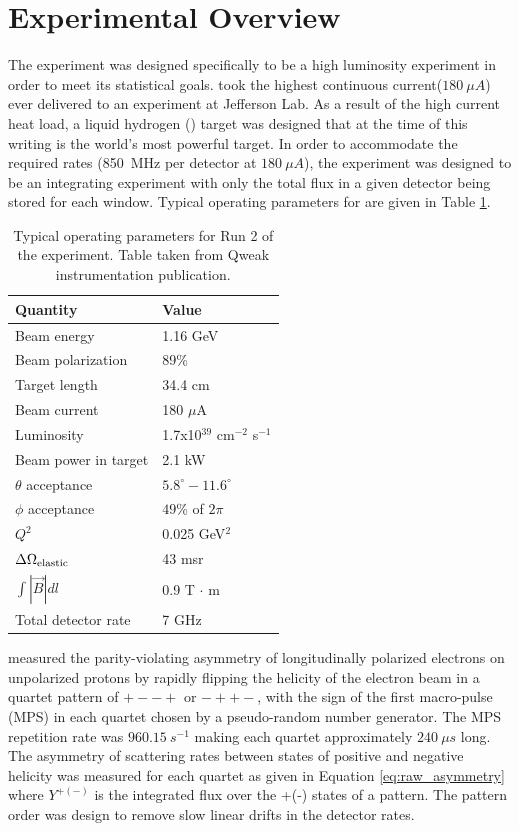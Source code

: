 \section{Experimental Overview}
The \Qs experiment was designed specifically to be a high luminosity experiment in order to meet its statistical goals. \Qs took the highest continuous current($180~\mu A$) ever delivered to an experiment at Jefferson Lab. As a result of the high current heat load, a liquid hydrogen (\LH) target was designed that at the time of this writing is the world's most powerful \LHs target. In order to accommodate the required rates (850~MHz per detector at $180~\mu A$), the experiment was designed to be an integrating experiment with only the total flux in a given detector being stored for each window. Typical operating parameters for \Qs are given in Table \ref{tab:kinematics}.

\begin{table}[hbtbp]
\begin{center}
\caption{Typical operating parameters for Run 2 of the \Qs experiment. Table taken from Qweak instrumentation publication. \cite{QweakNIM}}
\label{tab:kinematics}
\begin{tabular}{ll}
Quantity & Value   \\ \hline
Beam energy & 1.16 GeV \\
Beam polarization & 89\% \\
Target length & 34.4 cm \\
Beam current & 180 $\mu$A \\
Luminosity & 1.7x10$^{39}$ cm$^{-2}$ s$^{-1}$ \\
Beam power in target & 2.1 kW \\
$\theta$ acceptance& $5.8^\circ - 11.6^\circ$ \\
$ \phi$ acceptance & $49$\% of $2\pi$  \\
$Q^2$ & 0.025 GeV$^2$ \\
$\Delta \Omega_{\rm elastic}$ & 43 msr  \\
$\int |\vec B| dl$ & 0.9 T $\cdot$ m  \\
Total detector rate  & 7 GHz \\
\end{tabular}
\end{center}
\end{table}

\Qs measured the parity-violating asymmetry of longitudinally polarized electrons on unpolarized protons by rapidly flipping the helicity of the electron beam in a quartet pattern of $+--+$ or $-++-$, with the sign of the first macro-pulse (MPS) in each quartet chosen by a pseudo-random number generator. The MPS repetition rate was $960.15~s^{-1}$ making each quartet approximately $240~\mu s$ long. The asymmetry of scattering rates between states of positive and negative helicity was measured for each quartet as given in Equation \ref{eq:raw_asymmetry} where $Y^{+(-)}$ is the integrated flux over the +(-) states of a pattern. The pattern order was design to remove slow linear drifts in the detector rates. 

